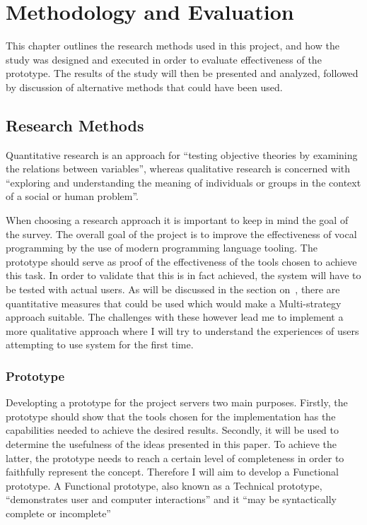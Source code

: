 \documentclass[../thesis.tex]{subfiles}
\begin{document}
\chapter{Methodology and Evaluation}\label{methodology_and_evaluation}
This chapter outlines the research methods used in this project,
and how the study was designed and executed in order to evaluate effectiveness of the prototype.
The results of the study will then be presented and analyzed, followed by
discussion of alternative methods that could have been used.


\section{Research Methods}
Quantitative research is an approach for ``testing objective theories by examining the relations between variables'', whereas qualitative research is concerned with ``exploring and understanding the meaning of individuals or groups in the context of a social or human problem''. \parencite{creswell2018}

When choosing a research approach it is important to keep in mind the goal of the survey.
The overall goal of the project is to improve the effectiveness of vocal programming by the use of modern programming language tooling.
The prototype should serve as proof of the effectiveness of the tools chosen to achieve this task.
In order to validate that this is in fact achieved, the system will have to be tested with actual users.
As will be discussed in the section on~, there are quantitative measures that could be used which would make a Multi-strategy approach suitable.
The challenges with these however lead me to implement a more qualitative approach where I will try to understand the experiences of users attempting to use system for the first time.



\subsection{Prototype}
Developting a prototype for the project servers two main purposes.
Firstly, the prototype should show that the tools chosen for the implementation has the capabilities needed to achieve the desired results.
Secondly, it will be used to determine the usefulness of the ideas presented in this paper.
To achieve the latter, the prototype needs to reach a certain level of completeness in order to faithfully represent the concept.
Therefore I will aim to develop a Functional prototype.
A Functional prototype, also known as a Technical prototype, ``demonstrates user and computer interactions'' and it 
``may be syntactically complete or incomplete''~\parencite{jones2000rapid}
\end{document}
